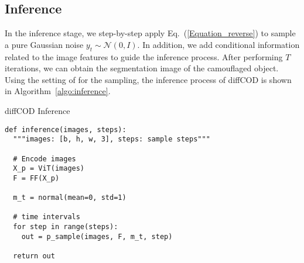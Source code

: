 \documentclass{ecai}
\begin{document}
\subsection{Inference}
\label{Inference}
In the inference stage, we step-by-step apply Eq.~(\ref{Equation_reverse}) to sample a pure Gaussian noise $y_{t} \sim \mathcal{N}(0, I)$. In addition, we add conditional information related to the image features to guide the inference process. After performing $T$ iterations, we can obtain the segmentation image of the camouflaged object. Using the setting of \cite{nichol2021improved} for the sampling, the inference process of diffCOD is shown in Algorithm~\ref{algo:inference}.


\begin{algorithm}[ht]
\caption{diffCOD Inference}
\label{algo:inference}
\lstset{language=Python}
\begin{lstlisting}[xleftmargin=-1em]
def inference(images, steps):
  """images: [b, h, w, 3], steps: sample steps"""

  # Encode images
  X_p = ViT(images) 
  F = FF(X_p) 
    
  m_t = normal(mean=0, std=1)
  
  # time intervals
  for step in range(steps):
    out = p_sample(images, F, m_t, step)

  return out
\end{lstlisting}
\end{algorithm}
\end{document}

